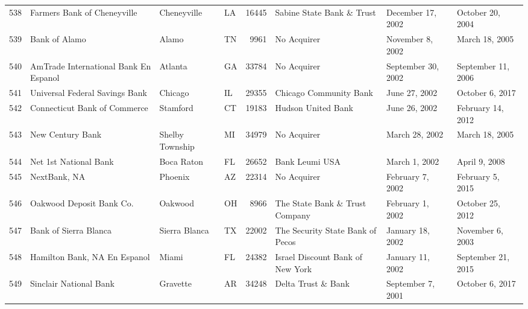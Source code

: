 \begin{tabular}{llllrlll}
538 &                        Farmers Bank of Cheneyville &         Cheneyville &  LA &  16445 &                          Sabine State Bank \& Trust &   December 17, 2002 &    October 20, 2004 \\
539 &                                      Bank of Alamo &               Alamo &  TN &   9961 &                                        No Acquirer &    November 8, 2002 &      March 18, 2005 \\
540 &             AmTrade International Bank  En Espanol &             Atlanta &  GA &  33784 &                                        No Acquirer &  September 30, 2002 &  September 11, 2006 \\
541 &                     Universal Federal Savings Bank &             Chicago &  IL &  29355 &                             Chicago Community Bank &       June 27, 2002 &     October 6, 2017 \\
542 &                       Connecticut Bank of Commerce &            Stamford &  CT &  19183 &                                 Hudson United Bank &       June 26, 2002 &   February 14, 2012 \\
543 &                                   New Century Bank &     Shelby Township &  MI &  34979 &                                        No Acquirer &      March 28, 2002 &      March 18, 2005 \\
544 &                              Net 1st National Bank &          Boca Raton &  FL &  26652 &                                     Bank Leumi USA &       March 1, 2002 &       April 9, 2008 \\
545 &                                       NextBank, NA &             Phoenix &  AZ &  22314 &                                        No Acquirer &    February 7, 2002 &    February 5, 2015 \\
546 &                           Oakwood Deposit Bank Co. &             Oakwood &  OH &   8966 &                     The State Bank \& Trust Company &    February 1, 2002 &    October 25, 2012 \\
547 &                              Bank of Sierra Blanca &       Sierra Blanca &  TX &  22002 &                   The Security State Bank of Pecos &    January 18, 2002 &    November 6, 2003 \\
548 &                      Hamilton Bank, NA  En Espanol &               Miami &  FL &  24382 &                   Israel Discount Bank of New York &    January 11, 2002 &  September 21, 2015 \\
549 &                             Sinclair National Bank &            Gravette &  AR &  34248 &                                 Delta Trust \& Bank &   September 7, 2001 &     October 6, 2017 \\

\end{tabular}
